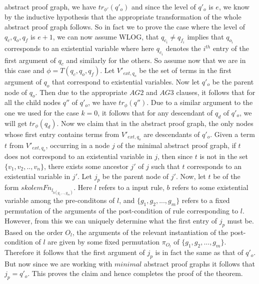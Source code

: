 \documentclass[sigconf]{acmart}
\begin{document}
abstract proof graph, we have $tr_{\phi'}(q'_{o})$ and since the level of
$q'_{o}$ is $e$, we know by the inductive hypothesis that the appropriate
transformation of the whole abstract proof graph follows. So in fact we to
prove the case where the level of $q_{c},q_{o},q_{f}$ is $e+1$, we can now
assume WLOG, that $q_{c_i}\neq q_{f_i}$ implies that $q_{o_i}$
corresponds to an existential variable where here $q_{c_i}$ denotes the
$i^{th}$ entry of the first argument of $q_{c}$ and similarly for the
others. So assume now that we are in this case and
$\phi= T(q_{c},q_{o},q_{f})$. Let $V'_{ext,q_{o}}$ be the set of terms in the
first argument of $q_{o}$ that correspond to existential variables. Now let
$q'_{o}$ be the parent node of $q_{o}$. Then due to the appropriate $AG2$ and
$AG3$ clauses, it follows that for all the child nodes $q''$ of $q'_{o}$, we
have $tr_{\phi}(q'')$. Due to a similar argument to the one we used for the
case $k=0$, it follows that for any descendant of $q_{d}$ of $q'_{o}$, we will
get $tr_{\phi}(q_{d})$. Now we claim that in the abstract proof graph, the
only nodes whose first entry contains terms from $V'_{ext,q_{o}}$ are
descendants of $q'_{o}$. Given a term $t$ from $V'_{ext,q_{o}}$, occurring in
a node $j$ of the minimal abstract proof graph, if $t$ does not correspond to
an existential variable in $j$, then since $t$ is not in the set
$\{v_{1},v_{2},..,v_{n}\}$, there exists some ancestor $j'$ of $j$ such that
$t$ corresponds to an existential variable in $j'$. Let $j_{p}$ be the parent
node of $j'$. Now, let $t$ be of the form
$skolemFn_{l_{b(g_{1},..,g_{m})}}$. Here $l$ refers to a input rule, $b$ refers
to some existential variable among the pre-conditons of $l$, and
$\{g_{1},g_{2},...,g_{m}\}$ refers to a fixed permutation of the arguments of
the post-condition of rule corresponding to $l$. However, from this we can
uniquely determine what the first entry of $j_{p}$ must be. Based on the order
$O_{l}$, the arguments of the relevant instantiation of the post-condition of
$l$ are given by some fixed permutation $\pi_{O_{l}}$ of
$\{g_{1},g_{2},...,g_{m}\}$. Therefore it follows that the first argument of
$j_{p}$ is in fact the same as that of $q'_{o}$. But now since we are working
with $\textit{minimal}$ abstract proof graphs it follows that
$j_{p} = q'_{o}$. This proves the claim and hence completes the proof of the
theorem.


\end{document}
